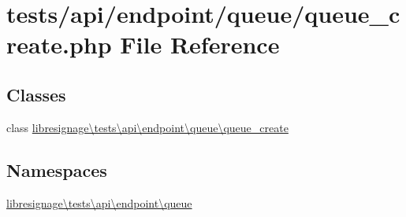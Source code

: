 \hypertarget{tests_2api_2endpoint_2queue_2queue__create_8php}{}\section{tests/api/endpoint/queue/queue\+\_\+create.php File Reference}
\label{tests_2api_2endpoint_2queue_2queue__create_8php}
\subsection*{Classes}
\begin{DoxyCompactItemize}
\item 
class \hyperlink{classlibresignage_1_1tests_1_1api_1_1endpoint_1_1queue_1_1queue__create}{libresignage\textbackslash{}tests\textbackslash{}api\textbackslash{}endpoint\textbackslash{}queue\textbackslash{}queue\+\_\+create}
\end{DoxyCompactItemize}
\subsection*{Namespaces}
\begin{DoxyCompactItemize}
\item 
 \hyperlink{namespacelibresignage_1_1tests_1_1api_1_1endpoint_1_1queue}{libresignage\textbackslash{}tests\textbackslash{}api\textbackslash{}endpoint\textbackslash{}queue}
\end{DoxyCompactItemize}

